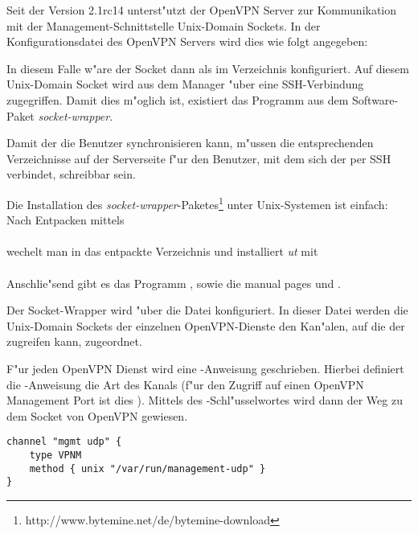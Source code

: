 \nl Seit der Version 2.1rc14 unterst"utzt der OpenVPN Server
zur Kommunikation mit der Management-Schnittstelle Unix-Domain Sockets.
In der Konfigurationsdatei des OpenVPN Servers wird dies wie folgt angegeben:

\nl{}

\nl In diesem Falle w"are der Socket dann als
 im Verzeichnis  konfiguriert.
%
Auf diesem Unix-Domain Socket wird aus dem Manager "uber
eine SSH-Verbindung zugegriffen.
Damit dies m"oglich ist, existiert das Programm  aus dem
Software-Paket \textsl{socket-wrapper}.

Damit der \Nbm{} die Benutzer synchronisieren
kann, m"ussen die entsprechenden Verzeichnisse auf der Serverseite
f"ur den Benutzer, mit dem sich der \Nbm{}
per SSH verbindet, schreibbar sein.

\newpage


\nl Die Installation des
\textsl{socket-wrapper}-Paketes\footnote{http://www.bytemine.net/de/bytemine-download
} unter Unix-Systemen ist einfach: Nach Entpacken mittels\\
\textit{}\\
wechelt man in das entpackte Verzeichnis und installiert \textit{ut} mit\\
\textit{}\\

Anschlie"send gibt es das Programm , sowie die
manual pages  und .


\nl Der Socket-Wrapper wird "uber die Datei 
konfiguriert.  In dieser Datei werden die Unix-Domain Sockets der
einzelnen OpenVPN-Dienste den Kan"alen, auf die der \Nbm{} zugreifen
kann, zugeordnet.

F"ur jeden OpenVPN Dienst wird eine -Anweisung geschrieben.
Hierbei definiert die -Anweisung die Art des Kanals (f"ur den
Zugriff auf einen OpenVPN Management Port ist dies ).
Mittels des -Schl"usselwortes wird dann der Weg zu dem
Socket von OpenVPN gewiesen.

\begin{verbatim}
channel "mgmt udp" {
    type VPNM
    method { unix "/var/run/management-udp" }
}
\end{verbatim}
\newpage

